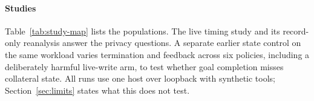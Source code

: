 


\paragraph{Studies}
Table~\ref{tab:study-map} lists the populations. The live timing study and its record-only reanalysis answer the privacy questions. A separate earlier state control on the same workload varies termination and feedback across six policies, including a deliberately harmful live-write arm, to test whether goal completion misses collateral state. All runs use one host over loopback with synthetic tools; Section~\ref{sec:limits} states what this does not test.
